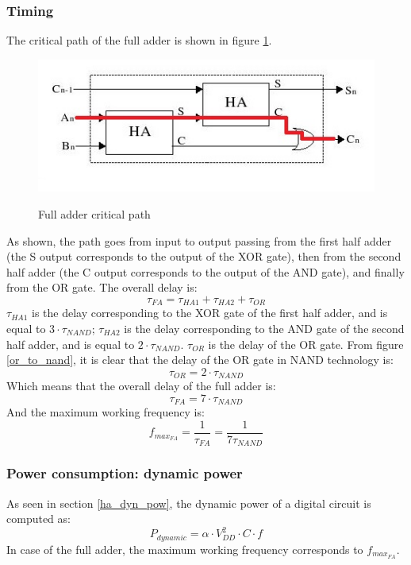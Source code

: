 \subsubsection{Timing}
The critical path of the full adder is shown in figure \ref{FA_timing}.
\begin{figure}[h]
	\caption{Full adder critical path}
	\includegraphics{img/FA_timing.jpg}
	\centering
	\label{FA_timing}
\end{figure}
As shown, the path goes from input to output passing from the first half adder (the S output corresponds to the output of the XOR gate), then from the second half adder (the C output corresponds to the output of the AND gate), and finally from the OR gate. The overall delay is:
\begin{equation}
\tau_{FA} = \tau_{HA1} + \tau_{HA2} + \tau_{OR}
\end{equation}
$\tau_{HA1}$ is the delay corresponding to the XOR gate of the first half adder, and is equal to $3\cdot \tau_{NAND}$; $\tau_{HA2}$ is the delay corresponding to the AND gate of the second half adder, and is equal to $2\cdot \tau_{NAND}$. $\tau_{OR}$ is the delay of the OR gate. From figure \ref{or_to_nand}, it is clear that the delay of the OR gate in NAND technology is:
\begin{equation}
\tau_{OR} = 2\cdot \tau_{NAND}
\end{equation}
Which means that the overall delay of the full adder is:
\begin{equation}
\tau_{FA} = 7\cdot \tau_{NAND}
\end{equation}
And the maximum working frequency is:
\begin{equation}
f_{max_{FA}} = \frac{1}{\tau_{FA}} = \frac{1}{7 \tau_{NAND}}
\end{equation}
\subsubsection{Power consumption: dynamic power}
As seen in section \ref{ha_dyn_pow}, the dynamic power of a digital circuit is computed as:
\begin{equation}
P_{dynamic} = \alpha\cdot V_{DD}^2\cdot C\cdot f
\end{equation}
In case of the full adder, the maximum working frequency corresponds to $f_{max_{FA}}$.
